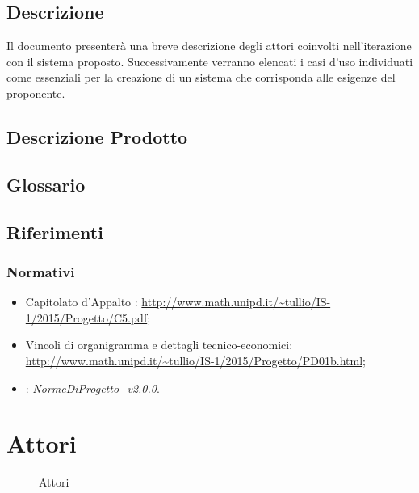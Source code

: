 \documentclass[12pt,a4paper]{article}
\begin{document}
\subsection{Descrizione}
Il documento presenterà una breve descrizione degli attori coinvolti nell'iterazione con il sistema proposto. Successivamente verranno elencati i casi d'uso individuati come essenziali per la creazione di un sistema che corrisponda alle esigenze del proponente.

\subsection{Descrizione Prodotto}
\descrizioneProdotto

\subsection{Glossario}\label{glossario}
\glossarioPrint

\subsection{Riferimenti}\label{riferimenti}
\subsubsection{Normativi}
\begin{itemize}
	\item Capitolato d’Appalto \prjL: \url{http://www.math.unipd.it/~tullio/IS-1/2015/Progetto/C5.pdf};
	\item Vincoli di organigramma e dettagli tecnico-economici: \url{http://www.math.unipd.it/~tullio/IS-1/2015/Progetto/PD01b.html};
	\item \NdP: \textit{NormeDiProgetto\_v2.0.0}. 
\end{itemize}

\newpage
\section{Attori}

\begin{figure}[H]
    \centering
    \caption{Attori}
    \label{fig:actors} 
\end{figure}
\end{document}
